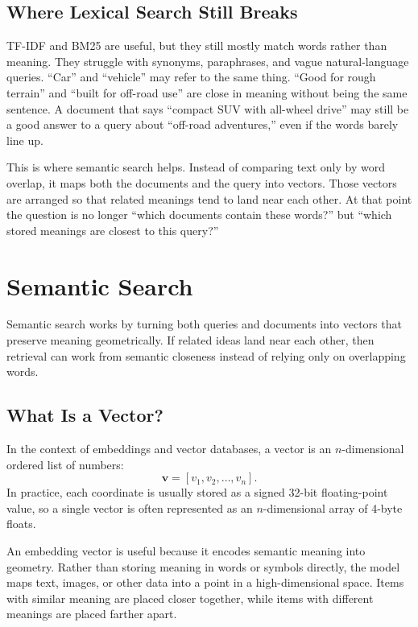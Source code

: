 \documentclass[12pt]{article}
\begin{document}
\subsection{Where Lexical Search Still Breaks}

TF-IDF and BM25 are useful, but they still mostly match words rather than
meaning. They struggle with synonyms, paraphrases, and vague
natural-language queries. ``Car'' and ``vehicle'' may refer to the same
thing. ``Good for rough terrain'' and ``built for off-road use'' are close
in meaning without being the same sentence. A document that says
``compact SUV with all-wheel drive'' may still be a good answer to a query
about ``off-road adventures,'' even if the words barely line up.

This is where semantic search helps. Instead of comparing text only by
word overlap, it maps both the documents and the query into vectors. Those
vectors are arranged so that related meanings tend to land near each
other. At that point the question is no longer ``which documents contain
these words?'' but ``which stored meanings are closest to this query?''

\section{Semantic Search}

Semantic search works by turning both queries and documents into vectors
that preserve meaning geometrically. If related ideas land near each
other, then retrieval can work from semantic closeness instead of relying
only on overlapping words.

\subsection{What Is a Vector?}

In the context of embeddings and vector databases, a vector is an
$n$-dimensional ordered list of numbers:
\[
\mathbf{v} = [v_1, v_2, \dots, v_n].
\]
In practice, each coordinate is usually stored as a signed 32-bit
floating-point value, so a single vector is often represented as an
$n$-dimensional array of 4-byte floats.

An embedding vector is useful because it encodes semantic meaning into
geometry. Rather than storing meaning in words or symbols directly, the
model maps text, images, or other data into a point in a high-dimensional
space. Items with similar meaning are placed closer together, while items
with different meanings are placed farther apart.
\end{document}
